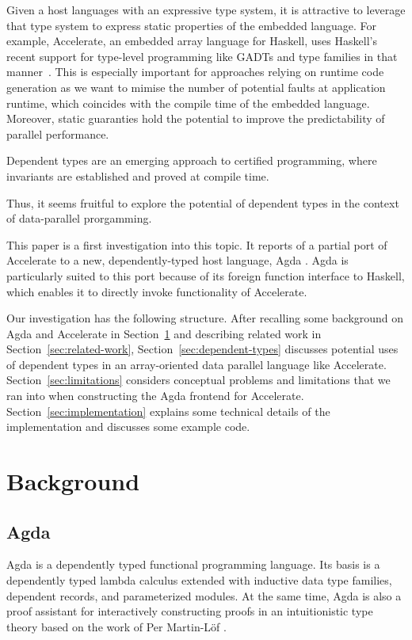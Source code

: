 \documentclass{llncs}
\begin{document}
Given a host languages with an expressive type system, it is attractive to leverage that type system to express static properties of the embedded language. For example, Accelerate, an embedded array language for Haskell, uses Haskell's recent support for type-level programming like GADTs and type families in that manner~\cite{ChakravartyKellerLeeMcdonellGrover2011}. This is especially important for approaches relying on runtime code generation as we want to mimise the number of potential faults at application runtime, which coincides with the compile time of the embedded language. Moreover, static guaranties hold the potential to improve the predictability of parallel performance.

Dependent types are an emerging approach to certified programming,
where invariants are established and proved at compile time.

Thus, it seems fruitful to explore the potential of dependent types in
the context of data-parallel prorgamming.

This paper is a first investigation into this topic. It reports of a
partial port of Accelerate to a new, dependently-typed host language,
Agda \cite{Norell2008,BoveDybjerNorell2009}. Agda is particularly
suited to this port because of its foreign function interface to
Haskell, which enables it to directly invoke functionality of
Accelerate. 

Our investigation has the following structure. After recalling some
background on Agda and Accelerate in Section~\ref{sec:background} and
describing related work in Section~\ref{sec:related-work}, 
Section~\ref{sec:dependent-types} discusses potential uses of
dependent types in an array-oriented data parallel language like
Accelerate. Section~\ref{sec:limitations} considers conceptual
problems and limitations that we ran into when constructing the Agda
frontend for Accelerate. Section~\ref{sec:implementation} explains
some technical details of the implementation and discusses some
example code. 

\section{Background}
\label{sec:background}

\subsection{Agda}
\label{sec:agda}

Agda \cite{Norell2008,BoveDybjerNorell2009} is a dependently typed
functional programming language. Its basis is a dependently typed
lambda calculus extended with inductive data type families, dependent
records, and parameterized modules. At the same time, Agda is also a
proof assistant for interactively constructing proofs in an
intuitionistic type theory based on the work of Per Martin-L\"of
\cite{MartinLoef1984}. 
\end{document}
